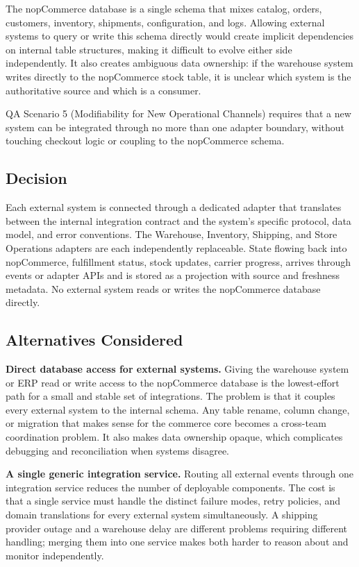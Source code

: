 The nopCommerce database is a single schema that mixes catalog, orders, customers, inventory,
shipments, configuration, and logs. Allowing external systems to query or write this schema
directly would create implicit dependencies on internal table structures, making it difficult
to evolve either side independently. It also creates ambiguous data ownership: if the warehouse
system writes directly to the nopCommerce stock table, it is unclear which system is the
authoritative source and which is a consumer.

QA Scenario 5 (Modifiability for New Operational Channels) requires that a new system can be
integrated through no more than one adapter boundary, without touching checkout logic or
coupling to the nopCommerce schema.

\subsection{Decision}

Each external system is connected through a dedicated adapter that translates between the
internal integration contract and the system's specific protocol, data model, and error
conventions. The Warehouse, Inventory, Shipping, and Store Operations adapters are each
independently replaceable. State flowing back into nopCommerce, fulfillment status, stock
updates, carrier progress, arrives through events or adapter APIs and is stored as a
projection with source and freshness metadata. No external system reads or writes the
nopCommerce database directly.

\subsection{Alternatives Considered}

\textbf{Direct database access for external systems.} Giving the warehouse system or ERP read
or write access to the nopCommerce database is the lowest-effort path for a small and stable
set of integrations. The problem is that it couples every external system to the internal
schema. Any table rename, column change, or migration that makes sense for the commerce core
becomes a cross-team coordination problem. It also makes data ownership opaque, which
complicates debugging and reconciliation when systems disagree.

\textbf{A single generic integration service.} Routing all external events through one
integration service reduces the number of deployable components. The cost is that a single
service must handle the distinct failure modes, retry policies, and domain translations for
every external system simultaneously. A shipping provider outage and a warehouse delay are
different problems requiring different handling; merging them into one service makes both
harder to reason about and monitor independently.


